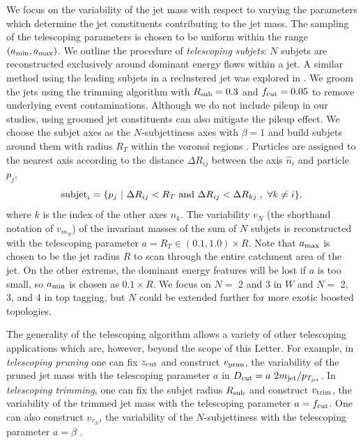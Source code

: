 \documentclass[aps,prl,floatfix,preprintnumbers,twocolumn,groupedaddress,nofootinbib]{revtex4-1}
\begin{document}
We focus on the variability of the jet mass with respect to varying the parameters which determine the jet constituents contributing to the jet mass. The sampling of the telescoping parameters is chosen to be uniform within the range $(a_{\rm min},a_{\rm max})$. We outline the procedure of \textit{telescoping subjets}: $N$ subjets are reconstructed exclusively around dominant energy flows within a jet. A similar method using the leading subjets in a reclustered jet was explored in \cite{Cui:2010km}. We groom the jets using the trimming algorithm with $R_{\rm sub}=0.3$ and $f_{\rm cut}=0.05$ to remove underlying event contaminations. Although we do not include pileup in our studies, using groomed jet constituents can also mitigate the pileup effect. We choose the subjet axes as the $N$-subjettiness axes \cite{Thaler:2011gf} with $\beta = 1$ and build subjets around them with radius $R_T$ within the voronoi regions \cite{Stewart:2010tn,Chien:2013kca,Stewart:2015waa,Thaler:2015xaa}. Particles are assigned to the nearest axis according to the distance $\Delta R_{ij}$ between the axis $\hat n_i$ and particle $p_j$,
\begin{equation}
    {\rm subjet}_{i} = \{p_j~|~\Delta R_{ij}<R_T~{\rm and}~\Delta R_{ij}<\Delta R_{kj}\;,~\forall k\neq i\},
\end{equation}
where $k$ is the index of the other axes $\hat n_k$. The variability $v_{N}$ (the shorthand notation of $v_{m_N}$) of the invariant masses of the sum of $N$ subjets is reconstructed with the telescoping parameter $a = R_{T}\in (0.1, 1.0)\times R$. Note that $a_{\rm max}$ is chosen to be the jet radius $R$ to scan through the entire catchment area of the jet. On the other extreme, the dominant energy features will be lost if $a$ is too small, so $a_{\rm min}$ is chosen as $0.1\times R$. We focus on $N = $ 2 and 3 in $W$ and $N = $ 2, 3, and 4 in top tagging, but $N$ could be extended further for more exotic boosted topologies.

The generality of the telescoping algorithm allows a variety of other telescoping applications which are, however, beyond the scope of this Letter. For example, in \textit{telescoping pruning} one can fix $z_{\rm cut}$ and construct $v_{\rm prun}$, the variability of the pruned jet mass with the telescoping parameter $a$ in $D_{\rm cut} = a~ 2m_{\rm jet}/p_{T_{\rm jet}}$. In
\textit{telescoping trimming}, one can fix the subjet radius $R_{\rm sub}$ and construct $v_{\rm trim}$, the variability of the trimmed jet mass with the telescoping parameter $a = f_{\rm cut}$. One can also construct $v_{\tau_N}$, the variability of the $N$-subjettiness with the telescoping parameter $a = \beta$ \cite{Thaler:2010tr}.
\end{document}
